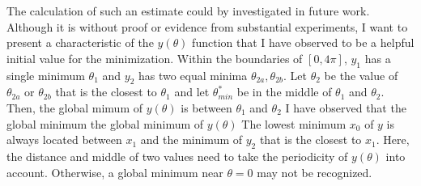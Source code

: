 The calculation of such an estimate could by investigated in future work.
Although it is without proof or evidence from substantial experiments, I want to
present a characteristic of the $y(\theta)$ function that I have observed to be
a helpful initial value for the minimization.
Within the boundaries of $[0, 4\pi]$, $y_1$ has a single minimum $\theta_1$ and
$y_2$ has two equal minima $\theta_{2a}, \theta_{2b}$.
Let $\theta_2$ be the value of $\theta_{2a}$ or $\theta_{2b}$ that is the
closest to $\theta_1$ and let $\theta_{min}^*$ be in the middle of $\theta_1$
and $\theta_2$.
Then, the global mimum of $y(\theta)$ is between $\theta_1$ and $\theta_2$
I have observed that the global minimum the global minimum of $y(\theta)$ 
The lowest minimum $x_0$ of $y$ is always located between $x_1$ and the minimum
of $y_2$ that is the closest to $x_1$.
Here, the distance and middle of two values need to take the periodicity of
$y(\theta)$ into account.
Otherwise, a global minimum near $\theta = 0$ may not be recognized.
